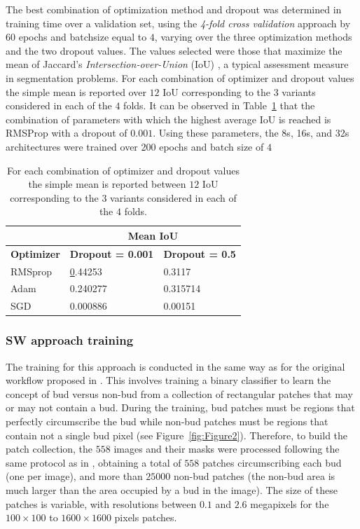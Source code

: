 \documentclass[a4paper,authoryear,review]{elsarticle}
\begin{document}
The best combination of optimization method and dropout was determined in training time over a validation set, using the \emph{4-fold cross validation} approach by 60 epochs and batchsize equal to $4$, varying over the three optimization methods and the two dropout values. The values selected were those that maximize the mean of Jaccard's \emph{Intersection-over-Union} (IoU) \citep{jaccard1912distribution}, a typical assessment measure in segmentation problems. For each combination of optimizer and dropout values the simple mean is reported over $12$ IoU corresponding to the $3$ variants considered in each of the $4$ folds. It can be observed in Table~\ref{tab:Table2} that the combination of parameters with which the highest average IoU is reached is RMSProp with a dropout of $0.001$. Using these parameters, the 8s, 16s, and 32s architectures were trained over 200 epochs and batch size of $4$

\begin{table}[]
    \centering
        \begin{tabular}{lll}
            \hline
            \multicolumn{1}{|l|}{} & \multicolumn{2}{c|}{\textbf{Mean IoU}} \\ \hline
            \multicolumn{1}{|c|}{\textbf{Optimizer}} & \multicolumn{1}{c|}{\textbf{Dropout = 0.001}} & \multicolumn{1}{c|}{\textbf{Dropout = 0.5}} \\ \hline
            RMSprop & {\ul 0.44253} & 0.3117 \\
            Adam & 0.240277 & 0.315714 \\
            SGD & 0.000886 & 0.00151 \\ \hline
    \end{tabular}%
    \caption{
For each combination of optimizer and dropout values the simple mean is reported between $12$ IoU corresponding to the $3$ variants considered in each of the $4$ folds.
}
    \label{tab:Table2}
\end{table}


\subsubsection{SW approach training}
\label{sec:swtrain}

The training for this approach is conducted in the same way as for the original workflow proposed in \citet{perez2017image}. This involves training a binary classifier to learn the concept of bud versus non-bud from a collection of rectangular patches that may or may not contain a bud. During the training, bud patches must be regions that perfectly circumscribe the bud while non-bud patches must be regions that contain not a single bud pixel (see Figure~\ref{fig:Figure2}). Therefore, to build the patch collection, the $558$ images and their masks were processed following the same protocol as in \citet{perez2017image}, obtaining a total of  $558$ patches circumscribing each bud (one per image), and more than $25000$ non-bud patches (the non-bud area is much larger than the area occupied by a bud in the image). The size of these patches is variable, with resolutions between $0.1$ and $2.6$ megapixels  for the  $100 \times 100$ to $1600 \times 1600$ pixels patches.
\end{document}

